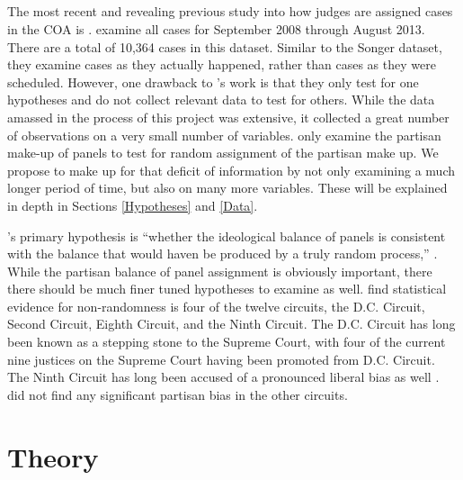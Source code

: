 \documentclass[12pt]{article}
\begin{document}
\subsection*{\cite{Chilton2014}}
The most recent and revealing previous study into how judges are assigned cases in the COA is \cite{Chilton2014}.  \citeauthor{Chilton2014} examine all cases for September 2008 through August 2013.  There are a total of 10,364 cases in this dataset.  Similar to the Songer dataset, they examine cases as they actually happened, rather than cases as they were scheduled.  However, one drawback to \citeauthor{Chilton2014}'s work is that they only test for one hypotheses and do not collect relevant data to test for others.  While the data amassed in the process of this project was extensive, it collected a great number of observations on a very small number of variables.  \citeauthor{Chilton2014} only examine the partisan make-up of panels to test for random assignment of the partisan make up.  We propose to make up for that deficit of information by not only examining a much longer period of time, but also on many more variables. These will be explained in depth in Sections \ref{Hypotheses} and \ref{Data}.  

\citeauthor{Chilton2014}'s primary hypothesis is ``whether the ideological balance of panels is consistent with the balance that would haven be produced by a truly random process,'' \citep[20]{Chilton2014}.  While the partisan balance of panel assignment is obviously important, there there should be much finer tuned hypotheses to examine as well.  \citeauthor{Chilton2014} find statistical evidence for non-randomness is four of the twelve circuits, the D.C. Circuit, Second Circuit, Eighth Circuit, and the Ninth Circuit.  The D.C. Circuit has long been known as a stepping stone to the Supreme Court, with four of the current nine justices on the Supreme Court having been promoted from D.C. Circuit.  The Ninth Circuit has long been accused of a pronounced liberal bias as well \citep{farris1997ninth}.  \citeauthor{Chilton2014} did not find any significant partisan bias in the other circuits.

\section{Theory}\label{Theory}
\end{document}
